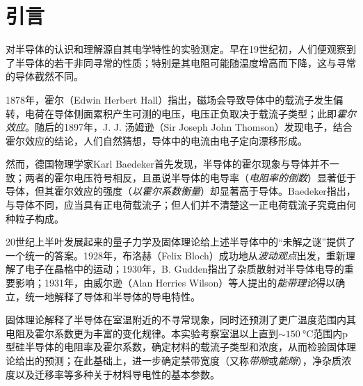 \documentclass[aps,pre,12pt,preprint,%
	onecolumn,showpacs,showkeys,nofootinbib]{revtex4-1}
\begin{document}
\section{引言}
	对半导体的认识和理解源自其电学特性的实验测定。早在19世纪初，人们便观察到了半导体的若干非同寻常的性质；特别是其电阻可能随温度增高而下降，这与寻常的导体截然不同\supercite{lukasiak2010history}。
	
	1878年，霍尔（Edwin Herbert Hall）指出，磁场会导致导体中的载流子发生偏转，电荷在导体侧面累积产生可测的电压，电压正负取决于载流子类型；此即\textit{霍尔效应}\supercite{hall1879new}。随后的1897年，J. J. 汤姆逊（Sir Joseph John Thomson）发现电子\supercite{thomson1897discovery}，结合霍尔效应的结论，人们自然猜想，导体中的电流由电子定向漂移形成。
	
	然而，德国物理学家Karl Baedeker首先发现，半导体的霍尔现象与导体并不一致；两者的霍尔电压符号相反，且虽说半导体的电导率（\textit{电阻率的倒数}）显著低于导体，但其霍尔效应的强度（\textit{以霍尔系数衡量}）却显著高于导体\supercite{lukasiak2010history}。Baedeker指出，与导体不同，应当具有正电荷载流子；但人们并不清楚这一正电荷载流子究竟由何种粒子构成。
	
	20世纪上半叶发展起来的量子力学及固体理论给上述半导体中的“未解之谜”提供了一个统一的答案。1928年，布洛赫（Felix Bloch）成功地从\textit{波动观点}出发，重新理解了电子在晶格中的运动\supercite{bloch1928quantum}；1930年，B. Gudden指出了杂质散射对半导体电导的重要影响\supercite{gudden1930elektrischen}；1931年，由威尔逊（Alan Herries Wilson）等人提出的\textit{能带理论}得以确立，统一地解释了导体和半导体的导电特性\supercite{wilson1931theory}。
	
	固体理论解释了半导体在室温附近的不寻常现象，同时还预测了更广温度范围内其电阻及霍尔系数更为丰富的变化规律。本实验考察室温以上直到$\sim\SI{150}{\celsius}$范围内p型硅半导体的电阻率及霍尔系数，确定材料的载流子类型和浓度，从而检验固体理论给出的预测；在此基础上，进一步确定禁带宽度（又称\textit{带隙}或\textit{能隙}），净杂质浓度以及迁移率等多种关于材料导电性的基本参数。
\end{document}
